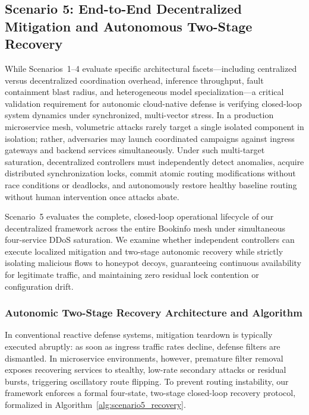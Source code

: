 
\subsection{Scenario 5: End-to-End Decentralized Mitigation and Autonomous Two-Stage Recovery}
\label{sec:scenario5_recovery}

While Scenarios~1--4 evaluate specific architectural facets—including centralized versus decentralized coordination overhead, inference throughput, fault containment blast radius, and heterogeneous model specialization—a critical validation requirement for autonomic cloud-native defense is verifying closed-loop system dynamics under synchronized, multi-vector stress. In a production microservice mesh, volumetric attacks rarely target a single isolated component in isolation; rather, adversaries may launch coordinated campaigns against ingress gateways and backend services simultaneously. Under such multi-target saturation, decentralized controllers must independently detect anomalies, acquire distributed synchronization locks, commit atomic routing modifications without race conditions or deadlocks, and autonomously restore healthy baseline routing without human intervention once attacks abate.

Scenario~5 evaluates the complete, closed-loop operational lifecycle of our decentralized framework across the entire Bookinfo mesh under simultaneous four-service DDoS saturation. We examine whether independent controllers can execute localized mitigation and two-stage autonomic recovery while strictly isolating malicious flows to honeypot decoys, guaranteeing continuous availability for legitimate traffic, and maintaining zero residual lock contention or configuration drift.

\subsubsection{Autonomic Two-Stage Recovery Architecture and Algorithm}

In conventional reactive defense systems, mitigation teardown is typically executed abruptly: as soon as ingress traffic rates decline, defense filters are dismantled. In microservice environments, however, premature filter removal exposes recovering services to stealthy, low-rate secondary attacks or residual bursts, triggering oscillatory route flipping. To prevent routing instability, our framework enforces a formal four-state, two-stage closed-loop recovery protocol, formalized in Algorithm~\ref{alg:scenario5_recovery}.

